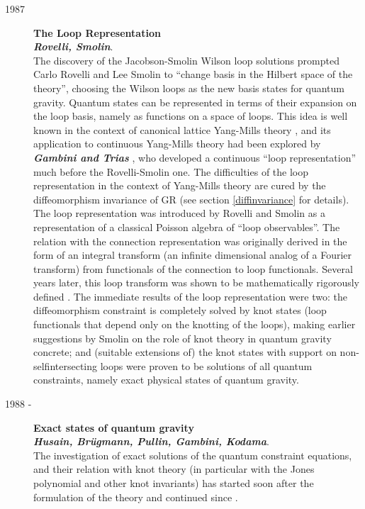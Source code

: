 \documentclass[12pt]{article}
\begin{document}
\begin{description}
	\item[1987] {\bf  The Loop Representation\\ 
	{\em Rovelli, Smolin}}. \\
	The discovery of the Jacobson-Smolin Wilson loop solutions 
	prompted Carlo Rovelli and Lee Smolin 
	\cite{RovelliSmolin87,Rovelli88,RovelliSmolin88,RovelliSmolin90} 
	to ``change basis in the Hilbert space of the theory'', choosing 
	the Wilson loops as the new basis states for quantum gravity.  
	Quantum states can be represented in terms of their expansion on 
	the loop basis, namely as functions on a space of loops.  This 
	idea is well known in the context of canonical lattice Yang-Mills 
	theory \cite{WilsonKoguth}, and its application to continuous 
	Yang-Mills theory had been explored by \textbf{\em Gambini and 
	Trias} \cite{GambiniTrias2,GambiniTrias}, who developed a continuous 
	``loop representation'' much before the Rovelli-Smolin one.  The 
	difficulties of the loop representation in the context of 
	Yang-Mills theory are cured by the diffeomorphism invariance of GR 
	(see section \ref{diffinvariance} for details).  The loop 
	representation was introduced by Rovelli and Smolin as a 
	representation of a classical Poisson algebra of ``loop 
	observables''.  The relation with the connection representation 
	was originally derived in the form of an integral transform (an 
	infinite dimensional analog of a Fourier transform) from 
	functionals of the connection to loop functionals.  Several years 
	later, this loop transform was shown to be mathematically 
	rigorously defined \cite{AshtekarIsham}.  The immediate results of 
	the loop representation were two: the diffeomorphism constraint is 
	completely solved by knot states (loop functionals that depend 
	only on the knotting of the loops), making earlier suggestions by 
	Smolin on the role of knot theory in quantum gravity 
	\cite{Smolin88} concrete; and (suitable 
	\cite{RovelliSmolin90,Smolin93} extensions of) the knot states 
	with support on non-selfintersecting loops were proven to be 
	solutions of all quantum constraints, namely exact physical states 
	of quantum gravity.
	
	\item[1988 - ] {\bf Exact states of quantum gravity\\
	{\em Husain, Br\"ugmann, Pullin, Gambini, Kodama}}.\\
	The investigation of exact solutions of the quantum constraint 
	equations, and their relation with knot theory (in particular with 
	the Jones polynomial and other knot invariants) has started soon 
	after the formulation of the theory and continued since 
	\cite{H1,H5,H4,H6,H3,H7,H8,GambiniPullin,Kodama,PullinEtAl97}.


\end{description}
\end{document}
